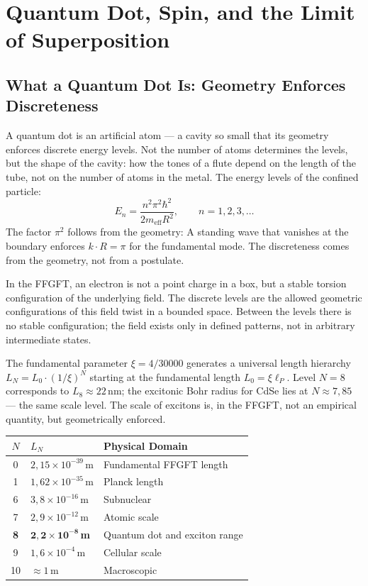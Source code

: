 \chapter{Quantum Dot, Spin, and the Limit of Superposition}
\label{ch:spin}

\section{What a Quantum Dot Is: Geometry Enforces Discreteness}

A quantum dot is an artificial atom --- a cavity so small
that its geometry enforces discrete energy levels. Not the number
of atoms determines the levels, but the shape of the cavity: how the
tones of a flute depend on the length of the tube, not on the number
of atoms in the metal. The energy levels of the confined particle:
\begin{equation}
  E_n = \frac{n^2\pi^2\hbar^2}{2m_{\mathrm{eff}}R^2},\qquad n = 1,2,3,\dots
\end{equation}
The factor $\pi^2$ follows from the geometry: A standing wave that
vanishes at the boundary enforces $k\cdot R = \pi$ for the fundamental mode. The
discreteness comes from the geometry, not from a postulate.

In the FFGFT, an electron is not a point charge in a box, but
a stable torsion configuration of the underlying field. The
discrete levels are the allowed geometric configurations of this
field twist in a bounded space. Between the levels there is
no stable configuration; the field exists only in defined
patterns, not in arbitrary intermediate states.

The fundamental parameter $\xi = 4/30000$ generates a universal
length hierarchy $L_N = L_0\cdot(1/\xi)^N$ starting at the
fundamental length $L_0 = \xi\ell_P$. Level $N = 8$ corresponds to
$L_8\approx22$\,nm; the excitonic Bohr radius for CdSe lies
at $N\approx7{,}85$ --- the same scale level. The scale of excitons
is, in the FFGFT, not an empirical quantity, but geometrically
enforced.

\begin{center}
\small
\begin{tabular}{cll}
\toprule
$N$ & $L_N$ & Physical Domain \\
\midrule
0 & $2{,}15\times10^{-39}$\,m & Fundamental FFGFT length \\
1 & $1{,}62\times10^{-35}$\,m & Planck length \\
6 & $3{,}8\times10^{-16}$\,m & Subnuclear \\
7 & $2{,}9\times10^{-12}$\,m & Atomic scale \\
\textbf{8} & $\mathbf{2{,}2\times10^{-8}}$\,\textbf{m} & Quantum dot and exciton range \\
9 & $1{,}6\times10^{-4}$\,m & Cellular scale \\
10 & $\approx1$\,m & Macroscopic \\
\bottomrule
\end{tabular}
\end{center}


